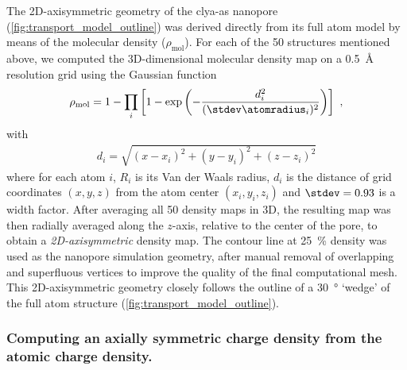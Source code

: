 The 2D-axisymmetric geometry of the \gls{clya-as} nanopore (\cref{fig:transport_model_outline}) was derived
directly from its full atom model by means of the molecular density ($\rho_\text{mol}$). For each of the 50
structures mentioned above, we computed the 3D-dimensional molecular density map on a \SI{0.5}{\angstrom}
resolution grid using the Gaussian function~\cite{Li-2013}
%
\begin{align}\label{eq:denspore}
  \rho_\text{mol} = 1 - \displaystyle\prod_{i} \left[ 1 - 
    \exp{\left(-\dfrac{d_i^2}{(\stdev\atomradius_{i})^2}\right)} \right]
    \text{ ,}
\end{align}
%
with
%
\begin{align}
  d_i = \sqrt{(x-x_i)^2 + (y-y_i)^2 + (z-z_i)^2}
\end{align}
%
where for each atom $i$, $R_i$ is its Van der Waals radius, $d_i$ is the distance of grid coordinates $(x, y,
z)$ from the atom center $(x_i, y_i, z_i)$ and $\stdev = 0.93$ is a width factor. After averaging all 50
density maps in 3D, the resulting map was then radially averaged along the $z$-axis, relative to the center of
the pore, to obtain a \emph{2D-axisymmetric} density map. The contour line at \SI{25}{\percent} density was
used as the nanopore simulation geometry, after manual removal of overlapping and superfluous vertices to
improve the quality of the final computational mesh. This 2D-axisymmetric geometry closely follows the outline
of a \SI{30}{\degree} `wedge' of the full atom structure (\cref{fig:transport_model_outline}).

\subsubsection{Computing an axially symmetric charge density from the atomic charge density.}
%

